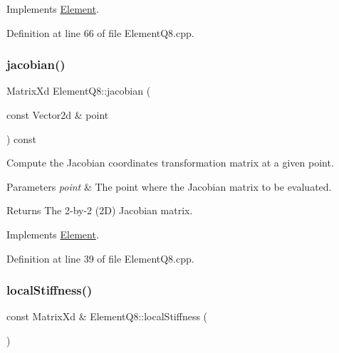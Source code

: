 Implements \mbox{\hyperlink{class_element_a54c5c297abff4ac3abacd815342a9645}{Element}}.



Definition at line 66 of file Element\+Q8.\+cpp.

\mbox{\label{class_element_q8_ae23bf98a466daa224224da495d5724ff}} 
\subsubsection{\texorpdfstring{jacobian()}{jacobian()}}
{\footnotesize\ttfamily Matrix\+Xd Element\+Q8\+::jacobian (\begin{DoxyParamCaption}\item[{const Vector2d \&}]{point }\end{DoxyParamCaption}) const\hspace{0.3cm}{\ttfamily [virtual]}}



Compute the Jacobian coordinates transformation matrix at a given point. 


\begin{DoxyParams}{Parameters}
{\em point} & The point where the Jacobian matrix to be evaluated. \\
\hline
\end{DoxyParams}
\begin{DoxyReturn}{Returns}
The 2-\/by-\/2 (2D) Jacobian matrix. 
\end{DoxyReturn}


Implements \mbox{\hyperlink{class_element_ad469c745f0bcb9d7a3431b1608c1ade6}{Element}}.



Definition at line 39 of file Element\+Q8.\+cpp.

\mbox{\label{class_element_q8_afc898e404f9abb5a5a4d74eee54476b7}} 
\subsubsection{\texorpdfstring{local\+Stiffness()}{localStiffness()}}
{\footnotesize\ttfamily const Matrix\+Xd \& Element\+Q8\+::local\+Stiffness (\begin{DoxyParamCaption}{ }\end{DoxyParamCaption})\hspace{0.3cm}{\ttfamily [virtual]}}



